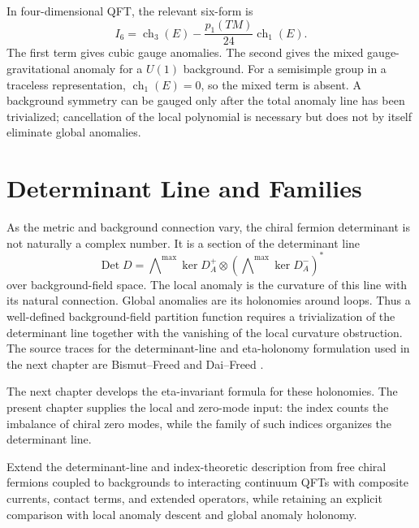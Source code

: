 In four-dimensional QFT, the relevant six-form is
\begin{equation}
  I_6
  =
  \operatorname{ch}_3(E)
  -
  \frac{p_1(TM)}{24}\operatorname{ch}_1(E).
  \label{eq:index-four-dimensional-anomaly-polynomial}
\end{equation}
The first term gives cubic gauge anomalies.  The second gives the mixed
gauge-gravitational anomaly for a \(U(1)\) background.  For a semisimple
group in a traceless representation, \(\operatorname{ch}_1(E)=0\), so the
mixed term is absent.  A background symmetry can be gauged only after the
total anomaly line has been trivialized; cancellation of the local polynomial
is necessary but does not by itself eliminate global anomalies.

\section{Determinant Line and Families}

As the metric and background connection vary, the chiral fermion determinant
is not naturally a complex number.  It is a section of the determinant line
\[
  \operatorname{Det}D
  =
  \bigwedge\nolimits^{\max}\ker D_A^+
  \otimes
  \left(\bigwedge\nolimits^{\max}\ker D_A^-\right)^\ast
\]
over background-field space.  The local anomaly is the curvature of this
line with its natural connection.  Global anomalies are its holonomies around
loops.  Thus a well-defined background-field partition function requires a
trivialization of the determinant line together with the vanishing of the
local curvature obstruction.
The source traces for the determinant-line and eta-holonomy formulation used
in the next chapter are Bismut--Freed and Dai--Freed
\cite{BismutFreed1986,DaiFreed1994}.

The next chapter develops the eta-invariant formula for these holonomies.
The present chapter supplies the local and zero-mode input: the index counts
the imbalance of chiral zero modes, while the family of such indices
organizes the determinant line.

\begin{openproblem}
\label{op:index-anomaly-line-interacting-qft}
Extend the determinant-line and index-theoretic description from free chiral
fermions coupled to backgrounds to interacting continuum QFTs with composite
currents, contact terms, and extended operators, while retaining an explicit
comparison with local anomaly descent and global anomaly holonomy.
\end{openproblem}
